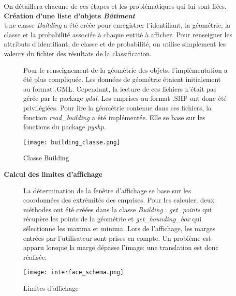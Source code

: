\noindent On détaillera chacune de ces étapes et les problématiques qui lui sont liées.\\

\noindent\textbf{Création d'une liste d'objets \textit{Bâtiment}}\\

Une classe \textit{Building} a été créée pour enregistrer l'identifiant, la géométrie, la classe et la probabilité associée à chaque entité à afficher. Pour renseigner les attributs d'identifiant, de classe et de probabilité, on utilise simplement les valeurs du fichier des résultats de la classification.\\

\begin{figure}[!h]
	\begin{minipage}{0.55\linewidth}\parindent12pt
		\indent  Pour le renseignement de la géométrie des objets, l'implémentation a été plus compliquée. Les données de géométrie étaient initialement au format .GML. Cependant, la lecture de ces fichiers n'était pas gérée par le package \textit{gdal}. Les emprises au format .SHP ont donc été privilégiées. Pour lire la géométrie contenue dans ces fichiers, la fonction \textit{read\_building} a été implémentée. Elle se base sur les fonctions du package \textit{pyshp}.\\
	\end{minipage}
	\hfill
	\begin{minipage}{0.40\linewidth}
		\centering
		\texttt{[image: building\_classe.png]}  \\
		\caption[Classe Building]{Classe Building}
		\label{fig:buildingclasse}
	\end{minipage}
\end{figure}

\newpage
\noindent\textbf{Calcul des limites d'affichage}\\
\begin{figure}[!h]
	\begin{minipage}{0.50\linewidth}\parindent12pt
		\indent  La détermination de la fenêtre d'affichage se base sur les coordonnées des extrémités des emprises. Pour les calculer, deux méthodes ont été créées dans la classe \textit{Building} : \textit{get\_points} qui récupère les points de la géométrie et \textit{get\_bounding\_box} qui sélectionne les maxima et minima. Lors de l'affichage, les marges entrées par l'utilisateur sont prises en compte. Un problème est apparu lorsque la marge dépasse l'image: une translation est donc réalisée.
	\end{minipage}
	\hfill
	\begin{minipage}{0.50\linewidth}
		\centering
		\texttt{[image: interface\_schema.png]}  \\
		\caption[Limites d'affichage]{Limites d'affichage}
		\label{fig:interfschema}
	\end{minipage}
\end{figure}

